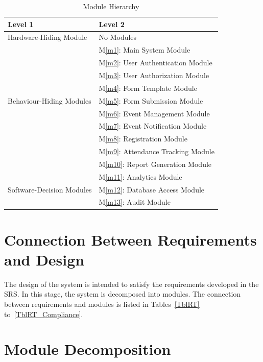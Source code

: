 \documentclass[12pt, titlepage]{article}
\newcommand{\mref}[1]{M\ref{#1}}
\begin{document}
\begin{table}[H]
\centering
\begin{tabular}{p{} p{}}
\toprule
\textbf{Level 1} & \textbf{Level 2}\\
\midrule

Hardware-Hiding Module
& No Modules\\
\midrule

\multirow{9}{0.3\textwidth}{Behaviour-Hiding Modules} 
& \mref{m1}: Main System Module\\
& \mref{m2}: User Authentication Module\\
& \mref{m3}: User Authorization Module\\
& \mref{m4}: Form Template Module\\
& \mref{m5}: Form Submission Module\\
& \mref{m6}: Event Management Module\\
& \mref{m7}: Event Notification Module\\
& \mref{m8}: Registration Module\\
& \mref{m9}: Attendance Tracking Module\\
& \mref{m10}: Report Generation Module\\
\midrule

\multirow{3}{0.3\textwidth}{Software-Decision Modules} 
& \mref{m11}: Analytics Module\\
& \mref{m12}: Database Access Module\\
& \mref{m13}: Audit Module\\
\bottomrule

\end{tabular}
\caption{Module Hierarchy}
\label{TblMH}
\end{table}

\section{Connection Between Requirements and Design} \label{SecConnection}

The design of the system is intended to satisfy the requirements developed in
the SRS. In this stage, the system is decomposed into modules. The connection
between requirements and modules is listed in Tables~\ref{TblRT} to~\ref{TblRT_Compliance}.


\section{Module Decomposition} \label{SecMD}
\end{document}

